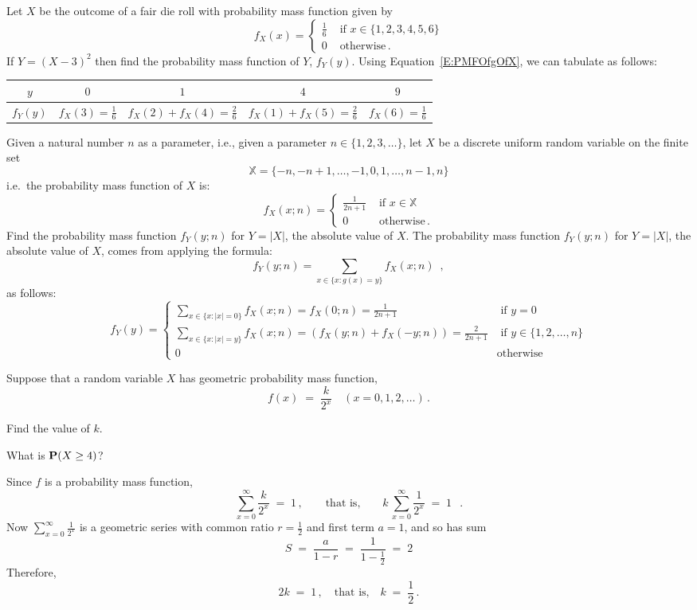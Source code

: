 \begin{ExerciseList}
\Exercise
Let $X$ be the outcome of a fair die roll with probability mass function given by
\[
f_X(x) = 
\begin{cases}
\frac{1}{6} & \text{ if } x \in \{1,2,3,4,5,6\}\\
0 & \text{ otherwise} \, .
\end{cases}
\]
If $Y = (X-3)^2$ then find the probability mass function of $Y$,  $f_Y (y)$.
\Answer
Using Equation~\eqref{E:PMFOfgOfX}, we can tabulate as follows:

\begin{tabular}{|c|c|c|c|c|}
\hline
$y$ & $0$ & $1$ & $4$ & $9$\\\hline
$f_Y(y)$ & $f_X(3)=\frac{1}{6}$ & $f_X(2)+f_X(4)=\frac{2}{6}$ & $f_X(1)+f_X(5)=\frac{2}{6}$ & $f_X(6)=\frac{1}{6}$\\\hline
\end{tabular}

\Exercise
Given a natural number $n$ as a parameter, i.e., given a parameter $n \in \{1,2,3,\ldots\}$, let $X$ be a discrete uniform random variable on the finite set
$$\mathbb{X}=\{-n,-n+1,\ldots,-1,0,1,\ldots,n-1,n\}$$
i.e.~the probability mass function of $X$ is:
\[
f_X(x;n) = 
\begin{cases}
\frac{1}{2n+1} & \text{ if } x \in \mathbb{X} \\
0 & \text{ otherwise}\, .
\end{cases}
\]
Find the probability mass function $f_Y(y;n)$ for $Y=|X|$, the absolute value of $X$.
\Answer
The probability mass function $f_Y(y;n)$ for $Y=|X|$, the absolute value of $X$, comes from applying the formula:
\[
f_Y(y;n) = \sum_{x \in \{ x: g(x)=y\}} f_X(x;n) \enspace ,
\]
as follows:
\[
f_Y(y) = 
\begin{cases}
\sum_{x \in \{ x: |x|=0\}} f_X(x;n) = f_X(0;n) = \frac{1}{2n+1} & \text{ if } y =0 \\
 \sum_{x \in \{ x: |x|=y\}} f_X(x;n) = \left( f_X(y;n)+f_X(-y;n) \right) = \frac{2}{2n+1} & \text{ if } y \in \{1,2,\ldots,n\} \\
0 & \text{otherwise}
\end{cases}
\]



\Exercise
Suppose that  a random variable $X$ has geometric  probability mass function,
  \[f(x)\;=\;\frac{k}{2^x}\quad (x=0,1,2,\dots)\,.\]
\be
\item Find the value of  $k$.
\item  What is  $\mathbf{P}(X\geq 4)$?
\ee
\Answer
\be
\item
Since $f$ is a probability mass function,  $$\sum_{x=0}^\infty\frac{k}{2^x}\;=\;1\,, 
\qquad \text{that is,}\qquad k\,\sum_{x=0}^\infty\frac{1}{2^x}\;=\;1\ \enspace.$$
Now $\displaystyle \sum_{x=0}^\infty\frac{1}{2^x}$ is a geometric series with common ratio $r= \frac{1}{2}$ and first term $a=1$,
and so has  sum
\[ S\;=\; \frac{a}{1-r} \;=\;\frac{1}{1-\frac{1}{2} } \;=\; 2\]
Therefore, \[  2 k\;=\; 1 \,, \quad \text{that
  is,}\quad k\;=\; \frac{1}{2}\,.\]


\end{ExerciseList}
